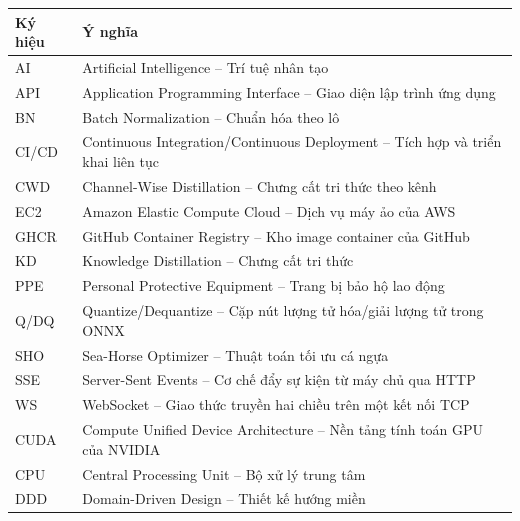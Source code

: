 \renewcommand{\contentsname}{Mục lục}
\tableofcontents

\renewcommand{\listfigurename}{Danh sách hình vẽ}
\listoffigures

\renewcommand{\listtablename}{Danh sách bảng}
\listoftables

\begin{longtable}{L{2.6cm}L{11.5cm}}
\toprule
\textbf{Ký hiệu} & \textbf{Ý nghĩa}\\
\midrule\endhead
AI      & Artificial Intelligence -- Trí tuệ nhân tạo\\
API     & Application Programming Interface -- Giao diện lập trình ứng dụng\\
BN      & Batch Normalization -- Chuẩn hóa theo lô\\
CI/CD   & Continuous Integration/Continuous Deployment -- Tích hợp và triển khai liên tục\\
CWD     & Channel-Wise Distillation -- Chưng cất tri thức theo kênh\\
EC2     & Amazon Elastic Compute Cloud -- Dịch vụ máy ảo của AWS\\
GHCR    & GitHub Container Registry -- Kho image container của GitHub\\
KD      & Knowledge Distillation -- Chưng cất tri thức\\
PPE     & Personal Protective Equipment -- Trang bị bảo hộ lao động\\
Q/DQ    & Quantize/Dequantize -- Cặp nút lượng tử hóa/giải lượng tử trong ONNX\\
SHO     & Sea-Horse Optimizer -- Thuật toán tối ưu cá ngựa\\
SSE     & Server-Sent Events -- Cơ chế đẩy sự kiện từ máy chủ qua HTTP\\
WS      & WebSocket -- Giao thức truyền hai chiều trên một kết nối TCP\\
CUDA    & Compute Unified Device Architecture -- Nền tảng tính toán GPU của NVIDIA\\
CPU     & Central Processing Unit -- Bộ xử lý trung tâm\\
DDD     & Domain-Driven Design -- Thiết kế hướng miền\\

\end{longtable}

